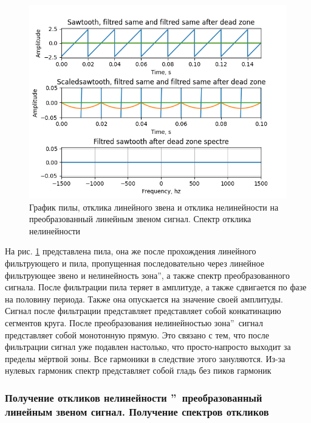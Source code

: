 \begin{figure}[H]
	\centering
	\includegraphics[width=1.05\linewidth]{body/images/filtred-sawtooth-after-dead-zone-and-its-spectre.png}
	\caption{График пилы, отклика линейного звена и отклика нелинейности на преобразованный
	линейным звеном сигнал. Спектр отклика нелинейности}
	\label{fig:36}
\end{figure}

На рис. \ref{fig:36} представлена пила, она же после прохождения
линейного фильтрующего и пила, пропущенная последовательно через линейное
фильтрующее звено и нелинейность  зона\textquotedblright,
а также спектр преобразованного сигнала. После фильтрации пила теряет в амплитуде,
а также сдвигается по фазе на половину периода. Также она опускается на значение
своей амплитуды. Сигнал после фильтрации представляет представляет собой
конкатинацию сегментов круга. После преобразования нелинейностью
 зона\textquotedblright\ сигнал представляет собой монотонную
прямую. Это связано с тем, что после фильтрации сигнал уже подавлен настолько, что
просто-напросто выходит за пределы мёртвой зоны. Все гармоники в следствие этого 
зануляются. Из-за нулевых гармоник спектр представляет собой гладь без пиков гармоник

\subsubsection{Получение откликов нелинейности
\textquotedblright\ преобразованный
линейным звеном сигнал. Получение спектров откликов}

